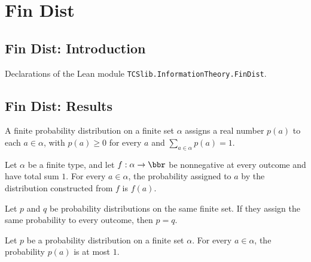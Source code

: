 \section{Fin Dist}
\subsection*{Fin Dist: Introduction}

Declarations of the Lean module \texttt{TCSlib.InformationTheory.FinDist}.

\subsection*{Fin Dist: Results}

\begin{definition}
\label{TCSlib.InformationTheory.FinDist}
\leanok
A finite probability distribution on a finite set $\alpha$ assigns a real number $p(a)$
to each $a\in\alpha$, with $p(a)\ge 0$ for every $a$ and $\sum_{a\in\alpha}p(a)=1$.
\end{definition}

\begin{theorem}
\label{TCSlib.InformationTheory.FinDist.coe_mk}
\leanok
{}
Let $\alpha$ be a finite type, and let $f:\alpha\to\bbr$ be nonnegative at every outcome
and have total sum $1$. For every $a\in\alpha$, the probability assigned to $a$ by the
distribution constructed from $f$ is $f(a)$.
\end{theorem}

\begin{theorem}
\label{TCSlib.InformationTheory.FinDist.ext}
\leanok
{}
Let $p$ and $q$ be probability distributions on the same finite set. If they assign the
same probability to every outcome, then $p=q$.
\end{theorem}

\begin{theorem}
\label{TCSlib.InformationTheory.FinDist.le_one}
\leanok
{}
Let $p$ be a probability distribution on a finite set $\alpha$. For every $a\in\alpha$,
the probability $p(a)$ is at most $1$.
\end{theorem}


